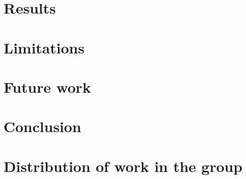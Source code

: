\documentclass{article}
\begin{document}

\section*{Results}

\section*{Limitations}
\section*{Future work}
\section*{Conclusion}
\section*{Distribution of work in the group}
\end{document}

